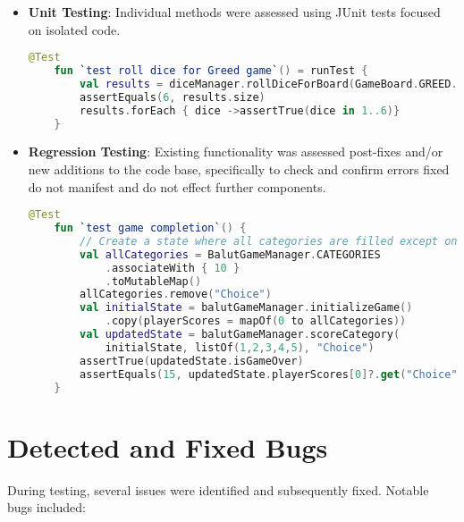 \begin{itemize}
    \item \textbf{Unit Testing}: Individual methods were assessed using JUnit tests focused on isolated code.
    \begin{lstlisting}[language=Kotlin, caption=Unit Test for Dice Rolling, label=lst:unit_dice_rolling]
    @Test
    fun `test roll dice for Greed game`() = runTest {
        val results = diceManager.rollDiceForBoard(GameBoard.GREED.modeName)
        assertEquals(6, results.size)
        results.forEach { dice ->assertTrue(dice in 1..6)}
    }
    \end{lstlisting}
    \item \textbf{Regression Testing}: Existing functionality was assessed post-fixes and/or new additions to the code base, specifically to check and confirm errors fixed do not manifest and do not effect further components.
    \begin{lstlisting}[language=Kotlin, caption=Regression Test for Game Completion, label=lst:regression_game_completion]
    @Test
    fun `test game completion`() {
        // Create a state where all categories are filled except one
        val allCategories = BalutGameManager.CATEGORIES
            .associateWith { 10 }
            .toMutableMap()
        allCategories.remove("Choice")
        val initialState = balutGameManager.initializeGame()
            .copy(playerScores = mapOf(0 to allCategories))
        val updatedState = balutGameManager.scoreCategory(
            initialState, listOf(1,2,3,4,5), "Choice")
        assertTrue(updatedState.isGameOver)
        assertEquals(15, updatedState.playerScores[0]?.get("Choice"))
    }
    \end{lstlisting}
\end{itemize}

\section{Detected and Fixed Bugs}

During testing, several issues were identified and subsequently fixed.  Notable bugs included:

